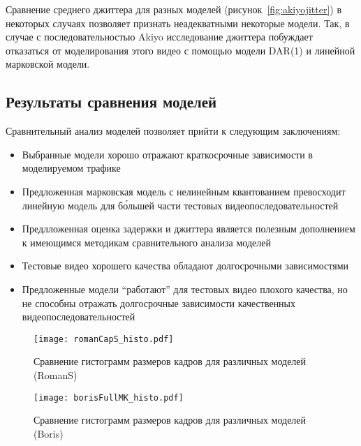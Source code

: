 Сравнение среднего джиттера для разных моделей (рисунок~\ref{fig:akiyojitter})
в некоторых случаях позволяет признать неадекватными некоторые модели.
Так, в случае с последовательностью Akiyo исследование джиттера побуждает
отказаться от моделирования этого видео с помощью модели DAR(1) и линейной
марковской модели.

\subsection{Результаты сравнения моделей}

Сравнительный анализ моделей позволяет прийти к следующим заключениям:

\begin{itemize}
    \item Выбранные модели хорошо отражают краткосрочные
        зависимости в моделируемом трафике
    \item Предложенная марковская модель с нелинейным квантованием
        превосходит линейную модель для б\'{о}льшей части
        тестовых видеопоследовательностей
    \item Предлложенная оценка задержки и джиттера является
        полезным дополнением к имеющимся методикам сравнительного анализа моделей
    \item Тестовые видео хорошего качества обладают
        долгосрочными зависимостями
    \item Предложенные модели ``работают'' для тестовых
        видео плохого качества, но не способны отражать
        долгосрочные зависимости качественных видеопоследовательностей
\end{itemize}

    \begin{figure}[h]
        \begin{center}
            \texttt{[image: romanCapS\_histo.pdf]}
        \end{center}
        \caption{Сравнение гистограмм размеров кадров для различных моделей (RomanS)}
        \label{fig:romanCapShisto}
    \end{figure}

    \begin{figure}[h]
        \begin{center}
            \texttt{[image: borisFullMK\_histo.pdf]}
        \end{center}
        \caption{Сравнение гистограмм размеров кадров для различных моделей (Boris)}
        \label{fig:borisFullMKhisto}
    \end{figure}

